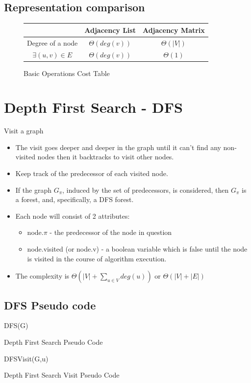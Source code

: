 \documentclass[12pt,letterpaper]{article}
\begin{document}
\subsection{Representation comparison}
\begin{figure}[h]
\centering
\begin{tabular}{|c|c|c|}
\hline
 & Adjacency List & Adjacency Matrix\\\hline\hline
Degree of a node & $\Theta(deg(v))$&$\Theta(|V|)$\\\hline
$\exists(u,v)\in E$&$\Theta(deg(v))$&$\Theta(1)$\\\hline
\end{tabular}
\caption{Basic Operations Cost Table}
\end{figure}
\section{Depth First Search - DFS}
Visit a graph
\begin{itemize}
\item The visit goes deeper and deeper in the graph until it can't find any non-visited nodes then it backtracks to visit other nodes. 
\item Keep track of the predecessor of each visited node.
\item If the graph $G_\pi$, induced by the set of predecessors, is considered, then $G_\pi$ is a forest, and, specifically, a DFS forest.
\item Each node will consist of 2 attributes:
\begin{itemize}
\item node.$\pi$ - the predecessor of the node in question
\item node.visited (or node.v) - a boolean variable which is false until the node is visited in the course of algorithm execution.
\end{itemize}
\item The complexity is $\Theta(|V|+\sum_{u\in V}{deg(u)})$ or $\Theta(|V|+|E|)$
\end{itemize}
\subsection{DFS Pseudo code}
\begin{algorithm}
DFS(G) 
\caption{Depth First Search Pseudo Code}
\label{DFS}
\end{algorithm}
\begin{algorithm}
DFSVisit(G,u) 
\caption{Depth First Search Visit Pseudo Code}
\label{DFSVisit}
\end{algorithm}
\FloatBarrier
\end{document}
